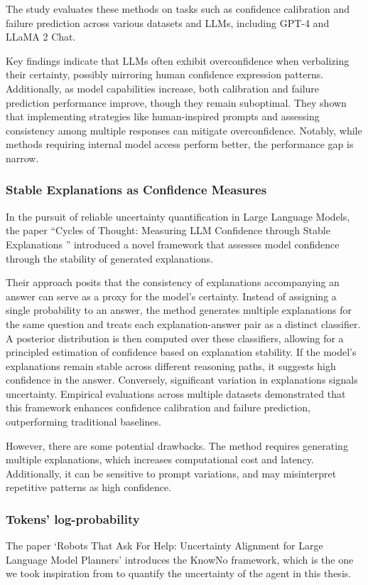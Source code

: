 The study evaluates these methods on tasks such as confidence calibration and
failure prediction across various datasets and LLMs, including GPT-4 and LLaMA 2
Chat.

Key findings indicate that LLMs often exhibit overconfidence when verbalizing their
certainty, possibly mirroring human confidence expression patterns. Additionally,
as model capabilities increase, both calibration and failure prediction performance
improve, though they remain suboptimal. They shown that implementing strategies like
human-inspired prompts and assessing consistency among multiple responses can mitigate
overconfidence. Notably, while methods requiring internal model access perform better,
the performance gap is narrow.

\subsubsection{Stable Explanations as Confidence Measures}
In the pursuit of reliable uncertainty quantification in Large Language Models, the
paper ``Cycles of Thought: Measuring LLM Confidence through Stable Explanations
'' \cite{becker2024cyclesthoughtmeasuringllm} introduced a novel framework that assesses
model confidence through the stability of generated explanations.

Their approach posits that the consistency of explanations accompanying an answer
can serve as a proxy for the model's certainty. Instead of assigning a single
probability to an answer, the method generates multiple explanations for the same
question and treats each explanation-answer pair as a distinct classifier. A
posterior distribution is then computed over these classifiers, allowing for a principled
estimation of confidence based on explanation stability. If the model's
explanations remain stable across different reasoning paths, it suggests high confidence
in the answer. Conversely, significant variation in explanations signals uncertainty.
Empirical evaluations across multiple datasets demonstrated that this framework
enhances confidence calibration and failure prediction, outperforming traditional
baselines.

However, there are some potential drawbacks. The method requires generating multiple
explanations, which increases computational cost and latency. Additionally, it
can be sensitive to prompt variations, and may misinterpret repetitive patterns as
high confidence.

\subsubsection{Tokens' log-probability}
\label{ssub:tokens_log_probability} The paper `Robots That Ask For Help: Uncertainty
Alignment for Large Language Model Planners'
\cite{ren2023robotsaskhelpuncertainty} introduces the KnowNo framework, which is
the one we took inspiration from to quantify the uncertainty of the agent in this
thesis.

